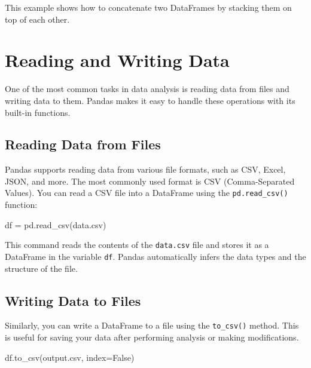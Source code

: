 \documentclass[
  letterpaper,
  DIV=11,
  numbers=noendperiod]{scrreprt}
\newenvironment{Shaded}{\begin{snugshade}}{\end{snugshade}}
\newcommand{\NormalTok}[1]{\textcolor[rgb]{0.00,0.23,0.31}{#1}}
\newcommand{\OperatorTok}[1]{\textcolor[rgb]{0.37,0.37,0.37}{#1}}
\newcommand{\StringTok}[1]{\textcolor[rgb]{0.13,0.47,0.30}{#1}}
\newcommand{\VariableTok}[1]{\textcolor[rgb]{0.07,0.07,0.07}{#1}}
\begin{document}
This example shows how to concatenate two DataFrames by stacking them on
top of each other.

\hypertarget{reading-and-writing-data}{%
\section{Reading and Writing Data}\label{reading-and-writing-data}}

One of the most common tasks in data analysis is reading data from files
and writing data to them. Pandas makes it easy to handle these
operations with its built-in functions.

\hypertarget{reading-data-from-files}{%
\subsection{Reading Data from Files}\label{reading-data-from-files}}

Pandas supports reading data from various file formats, such as CSV,
Excel, JSON, and more. The most commonly used format is CSV
(Comma-Separated Values). You can read a CSV file into a DataFrame using
the \texttt{pd.read\_csv()} function:

\begin{Shaded}
\begin{Highlighting}[]
\NormalTok{df }\OperatorTok{=}\NormalTok{ pd.read\_csv(}\StringTok{\textquotesingle{}data.csv\textquotesingle{}}\NormalTok{)}
\end{Highlighting}
\end{Shaded}

This command reads the contents of the \texttt{data.csv} file and stores
it as a DataFrame in the variable \texttt{df}. Pandas automatically
infers the data types and the structure of the file.

\hypertarget{writing-data-to-files}{%
\subsection{Writing Data to Files}\label{writing-data-to-files}}

Similarly, you can write a DataFrame to a file using the
\texttt{to\_csv()} method. This is useful for saving your data after
performing analysis or making modifications.

\begin{Shaded}
\begin{Highlighting}[]
\NormalTok{df.to\_csv(}\StringTok{\textquotesingle{}output.csv\textquotesingle{}}\NormalTok{, index}\OperatorTok{=}\VariableTok{False}\NormalTok{)}
\end{Highlighting}
\end{Shaded}
\end{document}
